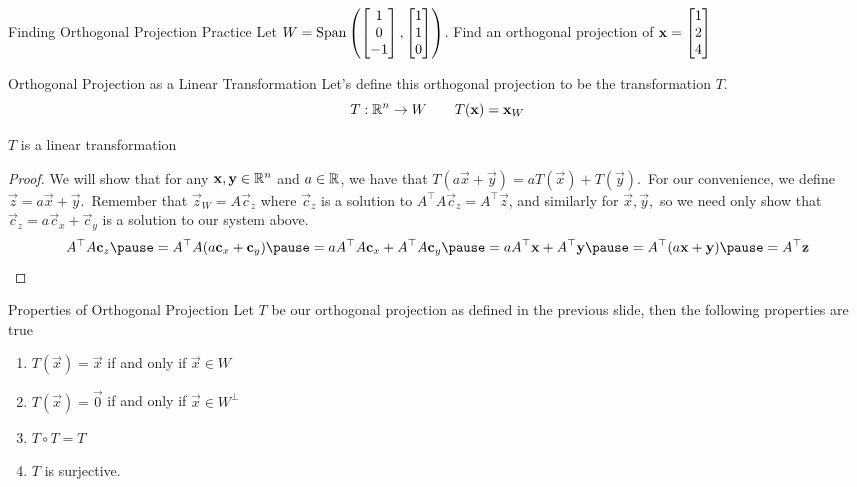 \documentclass[xcoler=dvipsnames, aspectratio=169]{beamer}
\begin{document}
    \begin{frame}{Finding Orthogonal Projection Practice}
        Let $W = \text{Span}\left(\begin{bmatrix}1\\0\\-1\end{bmatrix}, \begin{bmatrix}1\\1\\0\end{bmatrix}\right)$. Find an orthogonal projection of
        $\mathbf{x} = \begin{bmatrix}1\\2\\4\end{bmatrix}$
        \iftoggle{showSolutions}{
            \pause
            \vspace{30pt}
            \[
                \vec{x}_W = \bMat{0\\3\\3}
            \]
            \vspace{50pt}
        }{\vspace{130pt}}
    \end{frame}
    \begin{frame}{Orthogonal Projection as a Linear Transformation}
        Let's define this orthogonal projection to be the transformation $T$.
        \[
            T:\mathbb{R}^n\rightarrow W\qquad T(\mathbf{x}) = \mathbf{x}_W
        \]\pause\vspace{-30pt}
        \begin{theorem}
            $T$ is a linear transformation
        \end{theorem}\pause
        \vspace{-10pt}
        \begin{proof}
            We will show that for any $\mathbf{x},\mathbf{y}\in\mathbb{R}^n$ and $a\in\mathbb{R}$, we have that
            $T(a\vec{x} + \vec{y}) = aT(\vec{x}) + T(\vec{y})$.\pause\ For our convenience, we
            define $\vec{z} = a\vec{x} + \vec{y}$.\pause\
            Remember that $\vec{z}_W = A\vec{c}_z$ where $\vec{c}_z$ is a solution to 
            $A^\top A\vec{c}_z = A^\top\vec{z}$, and similarly for $\vec{x},\vec{y}$,\pause\, 
            so we need only show that $\vec{c}_z = a\vec{c}_x + \vec{c}_y$ is a solution to our 
            system above.
            \[
                A^\top A\vec{c}_z\pause = A^\top A(a\vec{c}_x + \vec{c}_y)\pause = 
                aA^\top A\vec{c}_x + A^\top A\vec{c}_y\pause = aA^\top\vec{x} + A^\top\vec{y}
                \pause = A^\top(a\vec{x} + \vec{y})\pause = A^\top\vec{z}
            \]
        \end{proof}
    \end{frame}
    \begin{frame}{Properties of Orthogonal Projection}
        Let $T$ be our orthogonal projection as defined in the previous slide, then the following properties
        are true
        \begin{enumerate}
            \pause\item $T(\vec{x}) = \vec{x}$ if and only if $\vec{x}\in W$
            \pause\item $T(\vec{x}) = \vec{0}$ if and only if $\vec{x}\in W^\perp$
            \pause\item $T\circ T = T$
            \pause\item $T$ is surjective.
        \end{enumerate}
    \end{frame}
\end{document}
